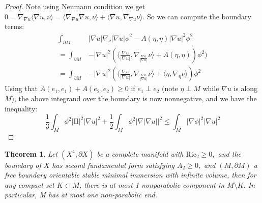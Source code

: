 \documentclass[12pt]{amsart}
\newcommand{\sff}{\mathrm{I\!I}}
\newcommand{\Ric}{\text{Ric}}
\newtheorem{theorem}{Theorem}[section]
\numberwithin{equation}{section}
\begin{document}
\begin{proof}
		Note using Neumann condition we get $0=\nabla_{\nabla u}\langle \nabla u,\nu \rangle=\langle \nabla_{\nabla u} \nabla u,\nu \rangle+\langle \nabla u, \nabla_{\nabla u} \nu \rangle.$
		So we can compute the boundary terms:
		\begin{align*}
			\int_{\partial M} & |\nabla u| \nabla_{\nu} |\nabla u| \phi^2 - A(\eta,\eta)|\nabla u|^2\phi^2\\
			= \int_{\partial M} & - |\nabla u|^2(\langle \frac{\nabla u}{|\nabla u|},\nabla_{\frac{\nabla u}{|\nabla u|}} \nu\rangle + A(\eta,\eta))\phi^2)\\
			= \int_{\partial M} & - |\nabla u|^2(\langle \frac{\nabla u}{|\nabla u|},\nabla_{\frac{\nabla u}{|\nabla u|}} \nu\rangle+ \langle \eta, \nabla_\eta \nu \rangle)\phi^2
		\end{align*}
		Using that $A(e_1,e_1)+A(e_2,e_2) \geq 0$ if $e_1 \perp e_2$ (note $\eta \perp M$ while $\nabla u$ is along $M$), the above integrand over the boundary is now nonnegative, and  we have the inequality:
		\begin{equation*}
			\frac{1}{3}\int_M \phi^2 |\sff|^2 |\nabla u|^2 + \frac{1}{2}\int_M \phi^2 |\nabla |\nabla u||^2 \leq \int_M |\nabla \phi|^2 |\nabla u|^2
		\end{equation*}
	\end{proof}


	\begin{theorem} \label{1npend}
		Let $(X^4,\partial X)$ be a complete manifold with $\Ric_2 \geq 0,$ and the boundary of $X$ has second fundamental form satisfying $A_2 \geq 0,$  and $(M,\partial M)$ a free boundary orientable stable minimal immersion with infinite volume, then for any compact set $K \subset M$, there is at most 1 nonparabolic component in $M \setminus K$. In particular, M has at most one non-parabolic end.
	\end{theorem}
\end{document}
